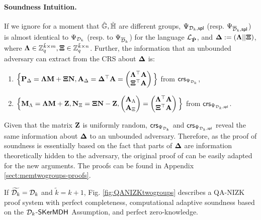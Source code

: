 \paragraph{Soundness Intuition.}   If we ignore for a moment that ${\hat{\mathbb{G}}}, {\check{\mathbb{H}}}$ are different groups, $\Psi_{\mathcal{D}_k,\mathsf{spl}}$ (resp. $\Psi_{\overline{\mathcal{D}}_k,\mathsf{spl}}$) is almost identical to $\Psi_{\mathcal{D}_k}$ (resp. to $\Psi_{\overline{\mathcal{D}}_k}$) for the language $\mathcal{L}_{{\hat{\mathbf{{P}}}}}$, and $\mathbf{{\Delta}}:=(\mathbf{{\Lambda}}||\mathbf{{\Xi}})$, where  $\mathbf{{\Lambda}} \in \mathbb{Z}_q^{\tilde{k} \times m},\mathbf{{\Xi}} \in \mathbb{Z}_q^{\tilde{k} \times n}$. Further, the information that an unbounded adversary can extract from the CRS about $\mathbf{{\Delta}}$ is:
 \begin{enumerate}
 \item $\Big\{\mathbf{{P}}_\Delta= \mathbf{{\Lambda}} \mathbf{{M}}+ \mathbf{{\Xi}}\mathbf{{N}}, \mathbf{{A}}_{\Delta} = \mathbf{{\Delta}}^{\top}\mathbf{{A}} =\begin{pmatrix} \mathbf{{\Lambda}}^{\top}\mathbf{{A}} \\ \mathbf{{\Xi}}^{\top}\mathbf{{A}} \end{pmatrix}\Big\}$ from $\mathsf{crs}_{\Psi_{\mathcal{D}_k}}$, 
 \item $\Big\{ \mathbf{{M}}_\Lambda = \mathbf{{\Lambda}} \mathbf{{M}}+\mathbf{{Z}}, \mathbf{{N}}_\Xi = \mathbf{{\Xi}}\mathbf{{N}}-\mathbf{{Z}},  \begin{pmatrix}\mathbf{{A}}_\Lambda\\\mathbf{{A}}_\Xi\end{pmatrix} = \begin{pmatrix} \mathbf{{\Lambda}}^{\top}\mathbf{{A}} \\ \mathbf{{\Xi}}^{\top}\mathbf{{A}} \end{pmatrix} \Big\}$ from $\mathsf{crs}_{\Psi_{\mathcal{D}_k,\mathsf{spl}}}$. 
 \end{enumerate}
Given that the matrix $\mathbf{{Z}}$ is uniformly random,  $\mathsf{crs}_{\Psi_{\mathcal{D}_k}}$ and $\mathsf{crs}_{\Psi_{\mathcal{D}_k,\mathsf{spl}}}$
reveal the same information about $\mathbf{{\Delta}}$ to an unbounded adversary. Therefore, as the proof of soundness is essentially based on the fact that parts of $\mathbf{{\Delta}}$ are information theoretically hidden to the adversary, the original proof of \cite{EC:KilWee15} can be easily adapted for the new arguments. The proofs 
can be found in Appendix \ref{sect:memtwogroups-proofs}.


\begin{theorem} If $\widetilde{\mathcal{D}_{k}}=\mathcal{D}_k$ and $\tilde{k}=k+1$,  Fig. \ref{fig:QANIZKtwogroups} describes a QA-NIZK
proof system with perfect completeness, computational adaptive soundness based on the  $\mathcal{D}_{k}$-$\mathsf{SKerMDH}$ Assumption, and perfect zero-knowledge. 
\label{theo:membtwogroups1}
\end{theorem}

